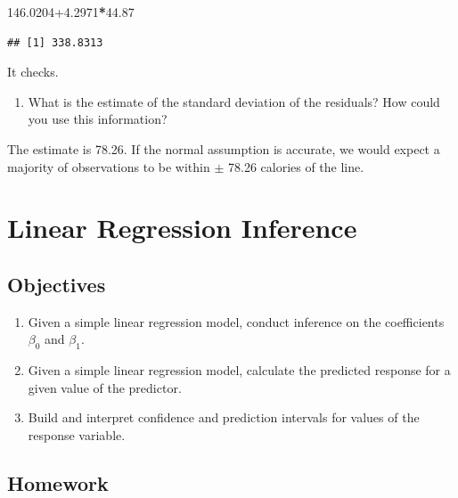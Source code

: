 \documentclass[
]{book}
\newenvironment{Shaded}{\begin{snugshade}}{\end{snugshade}}
\newcommand{\FloatTok}[1]{\textcolor[rgb]{0.00,0.00,0.81}{#1}}
\newcommand{\OperatorTok}[1]{\textcolor[rgb]{0.81,0.36,0.00}{\textbf{#1}}}
\providecommand{\tightlist}{%
  \setlength{\itemsep}{0pt}\setlength{\parskip}{0pt}}
\begin{document}
\begin{Shaded}
\begin{Highlighting}[]
\FloatTok{146.0204+4.2971}\OperatorTok{*}\FloatTok{44.87}
\end{Highlighting}
\end{Shaded}

\begin{verbatim}
## [1] 338.8313
\end{verbatim}

It checks.

\begin{enumerate}
\def\labelenumi{\alph{enumi}.}
\setcounter{enumi}{11}
\tightlist
\item
  What is the estimate of the standard deviation of the residuals? How could you use this information?
\end{enumerate}

The estimate is 78.26. If the normal assumption is accurate, we would expect a majority of observations to be within \(\pm\) 78.26 calories of the line.

\hypertarget{LRINF}{%
\chapter{Linear Regression Inference}\label{LRINF}}

\hypertarget{objectives-25}{%
\section{Objectives}\label{objectives-25}}

\begin{enumerate}
\def\labelenumi{\arabic{enumi})}
\tightlist
\item
  Given a simple linear regression model, conduct inference on the coefficients \(\beta_0\) and \(\beta_1\).\\
\item
  Given a simple linear regression model, calculate the predicted response for a given value of the predictor.\\
\item
  Build and interpret confidence and prediction intervals for values of the response variable.
\end{enumerate}

\hypertarget{homework-26}{%
\section{Homework}\label{homework-26}}
\end{document}
